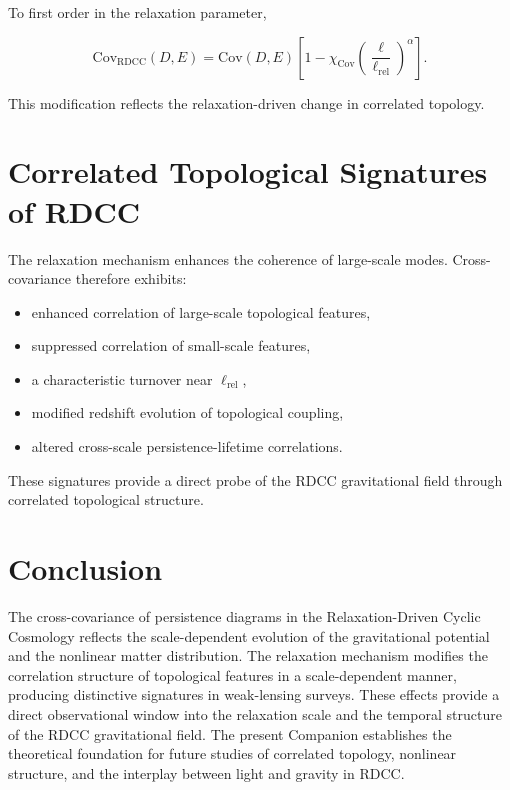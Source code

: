 \documentclass[11pt,a4paper]{article}
\begin{document}
To first order in the relaxation parameter,

\begin{equation}
    \mathrm{Cov}_{\mathrm{RDCC}}(D,E)
    = \mathrm{Cov}(D,E)
      \left[
        1 - \chi_{\mathrm{Cov}}
        \left(\frac{\ell}{\ell_{\mathrm{rel}}}\right)^{\alpha}
      \right].
\end{equation}

This modification reflects the relaxation-driven change in correlated topology.
\section{Correlated Topological Signatures of RDCC}

The relaxation mechanism enhances the coherence of large-scale modes. Cross-
covariance therefore exhibits:

\begin{itemize}
    \item enhanced correlation of large-scale topological features,
    \item suppressed correlation of small-scale features,
    \item a characteristic turnover near $\ell_{\mathrm{rel}}$,
    \item modified redshift evolution of topological coupling,
    \item altered cross-scale persistence-lifetime correlations.
\end{itemize}

These signatures provide a direct probe of the RDCC gravitational field through 
correlated topological structure.
\section{Conclusion}

The cross-covariance of persistence diagrams in the Relaxation-Driven Cyclic 
Cosmology reflects the scale-dependent evolution of the gravitational potential and 
the nonlinear matter distribution. The relaxation mechanism modifies the 
correlation structure of topological features in a scale-dependent manner, 
producing distinctive signatures in weak-lensing surveys. These effects provide a 
direct observational window into the relaxation scale and the temporal structure of 
the RDCC gravitational field. The present Companion establishes the theoretical 
foundation for future studies of correlated topology, nonlinear structure, and the 
interplay between light and gravity in RDCC.


\nocite{*}

\end{document}
